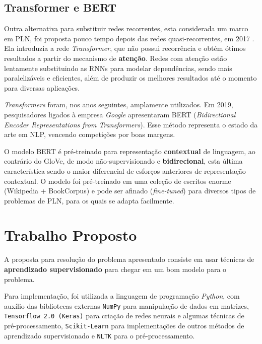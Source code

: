 \documentclass[twoside,conference,a4paper]{IEEEtran}
\begin{document}
\subsection{Transformer e BERT}
    Outra alternativa para substituir redes recorrentes, esta considerada um marco em PLN, foi proposta pouco tempo depois das redes quasi-recorrentes, em 2017 \cite{attention}. Ela introduzia a rede \textit{Transformer}, que não possui recorrência e obtém ótimos resultados a partir do mecanismo de \textbf{atenção}. Redes com atenção estão lentamente substituindo as RNNs para modelar dependências, sendo mais paralelizáveis e eficientes, além de produzir os melhores resultados até o momento para diversas aplicações.
    
    \textit{Transformers} foram, nos anos seguintes, amplamente utilizados. Em 2019, pesquisadores ligados à empresa \textit{Google} apresentaram BERT \cite{bert} (\textit{Bidirectional Encoder Representations from Transformers}). Esse método representa o estado da arte em NLP, vencendo competições por boas margens.
    
    O modelo BERT é pré-treinado para representação \textbf{contextual} de linguagem, ao contrário do GloVe, de modo não-supervisionado e \textbf{bidirecional}, esta última característica sendo o maior diferencial de esforços anteriores de representação contextual. O modelo foi pré-treinado em uma coleção de escritos enorme (Wikipedia + BookCorpus) e pode ser afinado (\textit{fine-tuned}) para diversos tipos de problemas de PLN, para os quais se adapta facilmente.

\section{Trabalho Proposto} \label{work}


A proposta para resolução do problema apresentado consiste em usar técnicas de \textbf{aprendizado supervisionado} para chegar em um bom modelo para o problema.

Para implementação, foi utilizada a linguagem de programação \textit{Python}, com auxílio das bibliotecas externas \texttt{NumPy} para manipulação de dados em matrizes, \texttt{Tensorflow 2.0 (Keras)} para criação de redes neurais e algumas técnicas de pré-processamento, \texttt{Scikit-Learn} para implementações de outros métodos de aprendizado supervisionado e \texttt{NLTK} para o pré-processamento.
\end{document}
